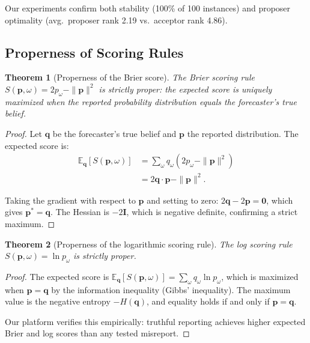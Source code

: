 \documentclass[10pt]{article}
\newtheorem{theorem}{Theorem}
\begin{document}
Our experiments confirm both stability (100\% of 100 instances) and proposer optimality (avg.\ proposer rank 2.19 vs.\ acceptor rank 4.86).

\subsection{Properness of Scoring Rules}
\label{app:proof-scoring}

\begin{theorem}[Properness of the Brier score]
The Brier scoring rule $S(\mathbf{p}, \omega) = 2p_\omega - \|\mathbf{p}\|^2$ is strictly proper: the expected score is uniquely maximized when the reported probability distribution equals the forecaster's true belief.
\end{theorem}

\begin{proof}
Let $\mathbf{q}$ be the forecaster's true belief and $\mathbf{p}$ the reported distribution. The expected score is:
\begin{align}
\mathbb{E}_\mathbf{q}[S(\mathbf{p}, \omega)] &= \sum_{\omega} q_\omega (2p_\omega - \|\mathbf{p}\|^2) \\
&= 2\mathbf{q} \cdot \mathbf{p} - \|\mathbf{p}\|^2.
\end{align}

Taking the gradient with respect to $\mathbf{p}$ and setting to zero:
$2\mathbf{q} - 2\mathbf{p} = \mathbf{0}$,
which gives $\mathbf{p}^* = \mathbf{q}$. The Hessian is $-2\mathbf{I}$, which is negative definite, confirming a strict maximum.
\end{proof}

\begin{theorem}[Properness of the logarithmic scoring rule]
The log scoring rule $S(\mathbf{p}, \omega) = \ln p_\omega$ is strictly proper.
\end{theorem}

\begin{proof}
The expected score is $\mathbb{E}_\mathbf{q}[S(\mathbf{p}, \omega)] = \sum_\omega q_\omega \ln p_\omega$, which is maximized when $\mathbf{p} = \mathbf{q}$ by the information inequality (Gibbs' inequality). The maximum value is the negative entropy $-H(\mathbf{q})$, and equality holds if and only if $\mathbf{p} = \mathbf{q}$.

Our platform verifies this empirically: truthful reporting achieves higher expected Brier and log scores than any tested misreport.
\end{proof}
\end{document}
